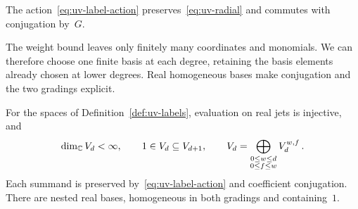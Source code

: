 The action~\eqref{eq:uv-label-action} preserves~\eqref{eq:uv-radial} and commutes with conjugation by~$G$.

The weight bound leaves only finitely many coordinates and monomials.
We can therefore choose one finite basis at each degree, retaining the basis elements already chosen at lower degrees.
Real homogeneous bases make conjugation and the two gradings explicit.

\begin{lemma}\label{lem:uv-labels}
For the spaces of Definition~\ref{def:uv-labels}, evaluation on real jets is injective, and
\begin{equation}\label{eq:uv-label-grading}
 \dim_\mathbb C V_d<\infty,\qquad 1\in V_d\subseteq V_{d+1},\qquad
 V_d=\bigoplus_{\substack{0\le w\le d\\0\le f\le w}}V_d^{w,f}\,.
\end{equation}
Each summand is preserved by~\eqref{eq:uv-label-action} and coefficient conjugation.
There are nested real bases, homogeneous in both gradings and containing~$1$.
\end{lemma}

